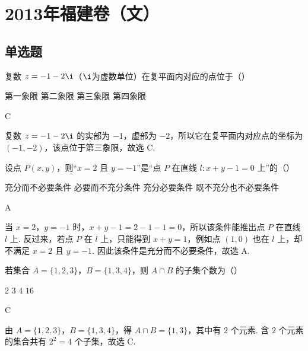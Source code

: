 \chapter{2013年福建卷（文）}

\section{单选题}

\begin{problem}
复数 \(z = -1 - 2\i\)（\(\i\)为虚数单位）在复平面内对应的点位于（\quad）

\choices
    {第一象限}
    {第二象限}
    {第三象限}
    {第四象限}
\begin{answer}
C
\end{answer}

\begin{solution}
复数 \(z=-1-2\i\) 的实部为 \(-1\)，虚部为 \(-2\)，所以它在复平面内对应点的坐标为 \((-1,-2)\)，该点位于第三象限，故选 C.
\end{solution}
\end{problem}

\begin{problem}
设点 \(P(x, y)\)，则“\(x = 2\) 且 \(y = -1\)”是“点 \(P\) 在直线 \(l: x + y - 1 = 0\) 上”的（\quad）

\choices
    {充分而不必要条件}
    {必要而不充分条件}
    {充分必要条件}
    {既不充分也不必要条件}
\begin{answer}
A
\end{answer}

\begin{solution}
当 \(x=2\)，\(y=-1\) 时，\(x+y-1=2-1-1=0\)，所以该条件能推出点 \(P\) 在直线 \(l\) 上. 反过来，若点 \(P\) 在 \(l\) 上，只能得到 \(x+y=1\)，例如点 \((1,0)\) 也在 \(l\) 上，却不满足 \(x=2\) 且 \(y=-1\). 因此该条件是充分而不必要条件，故选 A.
\end{solution}
\end{problem}

\begin{problem}
若集合 \(A = \{1, 2, 3\}\)，\(B = \{1, 3, 4\}\)，则 \(A \cap B\) 的子集个数为（\quad）

\choices
    {\(2\)}
    {\(3\)}
    {\(4\)}
    {\(16\)}
\begin{answer}
C
\end{answer}

\begin{solution}
由 \(A=\{1,2,3\}\)，\(B=\{1,3,4\}\)，得 \(A\cap B=\{1,3\}\)，其中有 \(2\) 个元素. 含 \(2\) 个元素的集合共有 \(2^2=4\) 个子集，故选 C.
\end{solution}
\end{problem}

